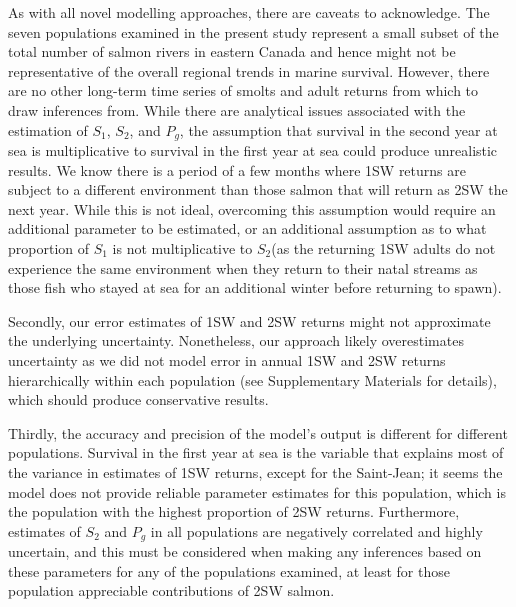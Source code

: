 \documentclass[12pt]{article}
\newcommand{\So}{$S_{1}$\xspace}
\newcommand{\St}{$S_{2}$\xspace}
\newcommand{\Pg}{$P_g$\xspace}
\begin{document}
As with all novel modelling approaches, there are caveats to acknowledge.
The seven populations examined in the present study represent a small subset of the total number of salmon rivers in eastern Canada and hence might not be representative
of the overall regional trends in marine survival. However, there are no other
long-term time series of smolts and adult returns from which to draw inferences from.
While there are analytical issues associated with the estimation of \So, \St, and \Pg,
the assumption that survival in the second year at sea is multiplicative to survival in the first
year at sea could produce unrealistic results.
We know there is a period of a few months where 1SW
returns are subject to a different environment than those salmon that will
return as 2SW the next year.
While this is not ideal,
overcoming this assumption would require an additional parameter to be
estimated, or an additional assumption as to what proportion of \So is not
multiplicative to \St (as the returning 1SW adults do not experience the same
environment when they return to their natal streams as those fish who stayed
at sea for an additional winter before returning to spawn).

Secondly, our error estimates of 1SW and 2SW returns might not approximate the
underlying uncertainty. Nonetheless, our approach likely overestimates
uncertainty as we did not model error in annual 1SW and 2SW returns
hierarchically within each population (see Supplementary Materials for
details), which should produce conservative results.


Thirdly, the accuracy and precision of the model's output is different
for different populations. Survival in the first year at sea is the variable
that explains most of the variance in estimates of 1SW returns, except for the
Saint-Jean; it seems
the model does not provide reliable parameter estimates for this population,
which is the population with the highest proportion of 2SW returns.
Furthermore, estimates of \St and \Pg in all populations are negatively correlated and highly
uncertain, and this must be considered when making any inferences based on
these parameters for any of the populations examined, at least for those population appreciable contributions of 2SW salmon.
\end{document}
